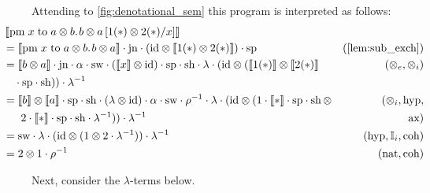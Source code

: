 \begin{example}
   Attending to \autoref{fig:denotational_sem} this program is interpreted as follows:
   \begin{align*}
   & \hspace{-30pt} \sem{ \text{pm} \hspace{3 pt} x \hspace{3 pt} \text{to} \hspace{3 pt} a \otimes b. \hspace{1pt} b \otimes a \, [1(*)\otimes 2 (*)/x]} \\
   & \hspace{-30pt} = \sem{\text{pm} \hspace{3 pt} x \hspace{3 pt} \text{to} \hspace{3 pt} a \otimes b. \hspace{1pt} b \otimes a} \cdot \jn \cdot \left( \id \otimes \sem{1(*)\otimes 2 (*)} \right) \cdot \spt & (\text{\autoref{lem:sub_exch}})\\
   & \hspace{-30pt} = \sem{b \otimes a} \cdot \jn \cdot \alpha \cdot \sw \cdot \left( \sem{x} \otimes \id\right) \cdot \spt \cdot \sh \cdot \lambda \cdot ( \id \otimes (\sem{1(*)} \otimes \sem{2(*)}   & (\otimes_e, \otimes_i) \\
   & \hspace{-20pt} \cdot \spt \cdot \sh))  \cdot \lambda^{-1} \\
   & \hspace{-30pt} = \sem{b} \otimes \sem{a} \cdot \spt \cdot \sh \cdot (\lambda \otimes \id) \cdot \alpha \cdot \sw \cdot \rho^{-1} \cdot \lambda \cdot (\id \otimes ( 1 \cdot \sem{*} \cdot \spt \cdot \sh \, \otimes  & (\otimes_i, \text{hyp}, \\
   & \hspace{-14pt}   2 \cdot \sem{*} \cdot \spt \cdot \sh \cdot \lambda^{-1}))  \cdot \lambda^{-1}  &  \text{ax}) \\
   & \hspace{-30pt} = \sw \cdot \lambda \cdot (\id \otimes ( 1 \otimes 2 \cdot \lambda^{-1} )) \cdot \lambda^{-1} & (\text{hyp}, \typeI_i, \text{coh}) \\
   & \hspace{-30pt} = 2 \otimes 1 \cdot \rho^{-1}  & (\text{nat}, \text{coh}) 
   \end{align*}

   Next, consider the  $\lambda$-terms below.


\end{example}
